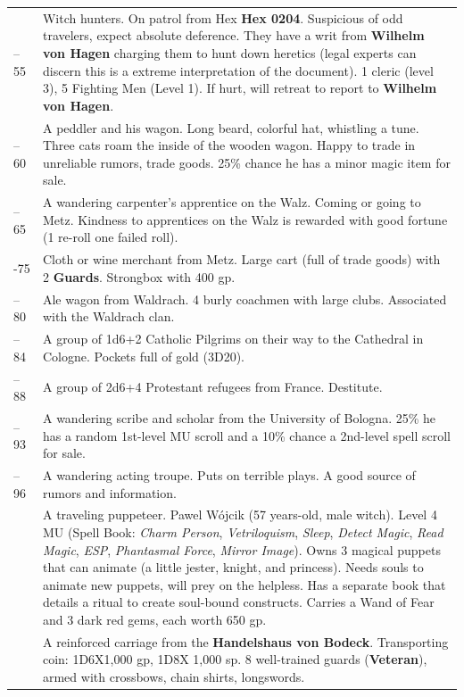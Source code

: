 \documentclass[
]{book}
\begin{document}
\begin{longtable}[]{@{}
  >{\raggedright\arraybackslash}p{}
  >{\raggedright\arraybackslash}p{}@{}}
51--55 & Witch hunters. On patrol from Hex \textbf{Hex 0204}. Suspicious of odd travelers, expect absolute deference. They have a writ from \textbf{Wilhelm von Hagen} charging them to hunt down heretics (legal experts can discern this is a extreme interpretation of the document). 1 cleric (level 3), 5 Fighting Men (Level 1). If hurt, will retreat to report to \textbf{Wilhelm von Hagen}. \\
56--60 & A peddler and his wagon. Long beard, colorful hat, whistling a tune. Three cats roam the inside of the wooden wagon. Happy to trade in unreliable rumors, trade goods. 25\% chance he has a minor magic item for sale. \\
61--65 & A wandering carpenter's apprentice on the Walz. Coming or going to Metz. Kindness to apprentices on the Walz is rewarded with good fortune (1 re-roll one failed roll). \\
66-75 & Cloth or wine merchant from Metz. Large cart (full of trade goods) with 2 \textbf{Guards}. Strongbox with 400 gp. \\
76--80 & Ale wagon from Waldrach. 4 burly coachmen with large clubs. Associated with the Waldrach clan. \\
81--84 & A group of 1d6+2 Catholic Pilgrims on their way to the Cathedral in Cologne. Pockets full of gold (3D20). \\
85--88 & A group of 2d6+4 Protestant refugees from France. Destitute. \\
89--93 & A wandering scribe and scholar from the University of Bologna. 25\% he has a random 1st-level MU scroll and a 10\% chance a 2nd-level spell scroll for sale. \\
94--96 & A wandering acting troupe. Puts on terrible plays. A good source of rumors and information. \\
97 & A traveling puppeteer. Pawel Wójcik (57 years-old, male witch). Level 4 MU (Spell Book: \emph{Charm Person}, \emph{Vetriloquism}, \emph{Sleep}, \emph{Detect Magic}, \emph{Read Magic}, \emph{ESP}, \emph{Phantasmal Force}, \emph{Mirror Image}). Owns 3 magical puppets that can animate (a little jester, knight, and princess). Needs souls to animate new puppets, will prey on the helpless. Has a separate book that details a ritual to create soul-bound constructs. Carries a Wand of Fear and 3 dark red gems, each worth 650 gp. \\
98 & A reinforced carriage from the \textbf{Handelshaus von Bodeck}. Transporting coin: 1D6X1,000 gp, 1D8X 1,000 sp. 8 well-trained guards (\textbf{Veteran}), armed with crossbows, chain shirts, longswords. \\

\end{longtable}
\end{document}
